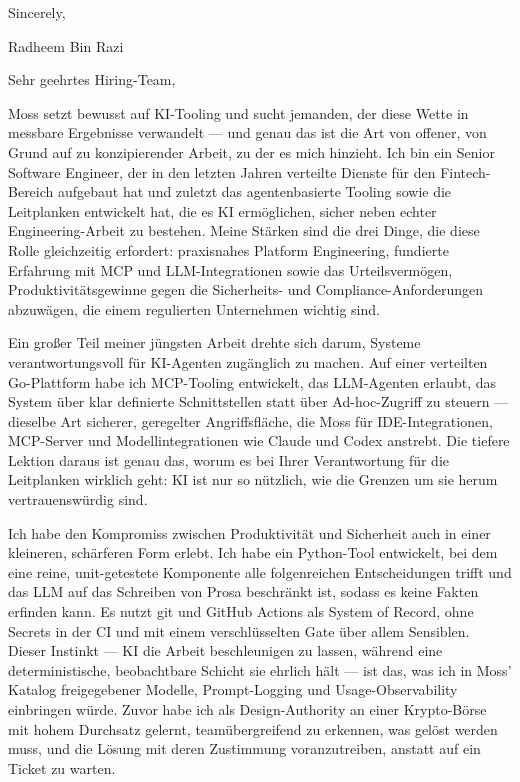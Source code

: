 \documentclass[11pt,a4paper]{coverletter}
\begin{document}
\closing{Sincerely,}{Radheem Bin Razi}

\clearpage
{}


\opening{Sehr geehrtes Hiring-Team,}

Moss setzt bewusst auf KI-Tooling und sucht jemanden, der diese Wette in messbare Ergebnisse verwandelt — und genau das ist die Art von offener, von Grund auf zu konzipierender Arbeit, zu der es mich hinzieht. Ich bin ein Senior Software Engineer, der in den letzten Jahren verteilte Dienste für den Fintech-Bereich aufgebaut hat und zuletzt das agentenbasierte Tooling sowie die Leitplanken entwickelt hat, die es KI ermöglichen, sicher neben echter Engineering-Arbeit zu bestehen. Meine Stärken sind die drei Dinge, die diese Rolle gleichzeitig erfordert: praxisnahes Platform Engineering, fundierte Erfahrung mit MCP und LLM-Integrationen sowie das Urteilsvermögen, Produktivitätsgewinne gegen die Sicherheits- und Compliance-Anforderungen abzuwägen, die einem regulierten Unternehmen wichtig sind.

Ein großer Teil meiner jüngsten Arbeit drehte sich darum, Systeme verantwortungsvoll für KI-Agenten zugänglich zu machen. Auf einer verteilten Go-Plattform habe ich MCP-Tooling entwickelt, das LLM-Agenten erlaubt, das System über klar definierte Schnittstellen statt über Ad-hoc-Zugriff zu steuern — dieselbe Art sicherer, geregelter Angriffsfläche, die Moss für IDE-Integrationen, MCP-Server und Modellintegrationen wie Claude und Codex anstrebt. Die tiefere Lektion daraus ist genau das, worum es bei Ihrer Verantwortung für die Leitplanken wirklich geht: KI ist nur so nützlich, wie die Grenzen um sie herum vertrauenswürdig sind.

Ich habe den Kompromiss zwischen Produktivität und Sicherheit auch in einer kleineren, schärferen Form erlebt. Ich habe ein Python-Tool entwickelt, bei dem eine reine, unit-getestete Komponente alle folgenreichen Entscheidungen trifft und das LLM auf das Schreiben von Prosa beschränkt ist, sodass es keine Fakten erfinden kann. Es nutzt git und GitHub Actions als System of Record, ohne Secrets in der CI und mit einem verschlüsselten Gate über allem Sensiblen. Dieser Instinkt — KI die Arbeit beschleunigen zu lassen, während eine deterministische, beobachtbare Schicht sie ehrlich hält — ist das, was ich in Moss' Katalog freigegebener Modelle, Prompt-Logging und Usage-Observability einbringen würde. Zuvor habe ich als Design-Authority an einer Krypto-Börse mit hohem Durchsatz gelernt, teamübergreifend zu erkennen, was gelöst werden muss, und die Lösung mit deren Zustimmung voranzutreiben, anstatt auf ein Ticket zu warten.
\end{document}
